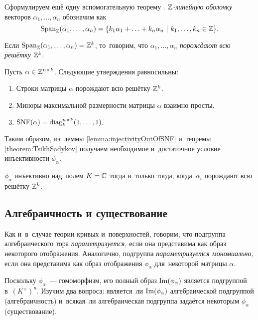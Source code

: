 \documentclass[a4paper,oneside]{article}
\begin{document}
Сформулируем ещё одну вспомогательную теорему \cite{TsikhSad14}.
\textit{$\mathbb{Z}$-линейную оболочку} векторов $\alpha_1, \ldots, \alpha_n$ обозначим как
\[
  \mathrm{Span}_{\mathbb{Z}}(\alpha_1, \ldots, \alpha_n) = \{ k_1 \alpha_1 + \ldots + k_n \alpha_n \ | \ k_1, \ldots, k_n \in \mathbb{Z} \}.
\]

Если $\mathrm{Span}_{\mathbb{Z}}(\alpha_1, \ldots, \alpha_n) = \mathbb{Z}^k$, то~говорим, что $\alpha_1, \ldots, \alpha_n$ \textit{порождают всю решётку} $\mathbb{Z}^k$.

\begin{theorem}
\label{theorem:TsikhSadykov}
  Пусть $\alpha \in \mathbb{Z}^{n \times k}$. Следующие утверждения равносильны:
  \begin{enumerate}
    \item Строки матрицы $\alpha$ порождают всю решётку $\mathbb{Z}^k$.
    \item Миноры максимальной размерности матрицы $\alpha$ взаимно просты.
    \item $\mathrm{SNF}(\alpha) = \mathrm{diag}^{n \times k}_k(1, \ldots, 1)$.
  \end{enumerate}
\end{theorem}

Таким образом, из~леммы \ref{lemma:injectivityOutOfSNF} и~теоремы \ref{theorem:TsikhSadykov}
получаем необходимое и~достаточное условие инъективности $\phi_\alpha$.

\begin{theorem}
\label{theorem:InjectivityCondition}
  $\phi_\alpha$ инъективно над~полем $K = \mathbb{C}$ тогда и~только тогда, когда~$\alpha_i$ порождают всю решётку $\mathbb{Z}^k$.
\end{theorem}

\subsection{Алгебраичность и существование}
Как и~в~случае теории кривых и~поверхностей, говорим, что подгруппа алгебраического тора \textit{параметризуется,}
если она представима как образ некоторого отображения. Аналогично, подгруппа \textit{параметризуется мономиально,}
если она представима как образ отображения $\phi_\alpha$ для~некоторой матрицы $\alpha$.

Поскольку $\phi_\alpha$~— гомоморфизм, его полный образ $\mathrm{Im}(\phi_\alpha)$ является подгруппой в~$(K^\times)^n$.
Изучим два вопроса: является~ли $\mathrm{Im}(\phi_\alpha)$ алгебраической подгруппой (алгебраичность) и~всякая~ли алгебраическая подгруппа задаётся некоторым $\phi_\alpha$ (существование).
\end{document}
